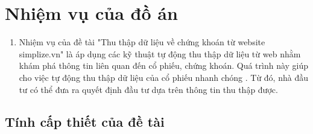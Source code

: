 \section{Nhiệm vụ của đồ án}
\begin{enumerate}
    \item []
            \hspace*{0.7cm} Nhiệm vụ của đề tài "Thu thập dữ liệu về chứng khoán từ website simplize.vn" là áp dụng các kỹ thuật tự động thu thập dữ liệu từ web nhằm khám phá thông tin liên quan đến cổ phiếu, chứng khoán. Quá trình này giúp cho việc tự động thu thập dữ liệu của cổ phiếu nhanh chóng . Từ đó, nhà đầu tư có thể đưa ra quyết định đầu tư dựa trên thông tin thu thập được.
\end{enumerate}
    \newpage

\subsection {Tính cấp thiết của đề tài}
